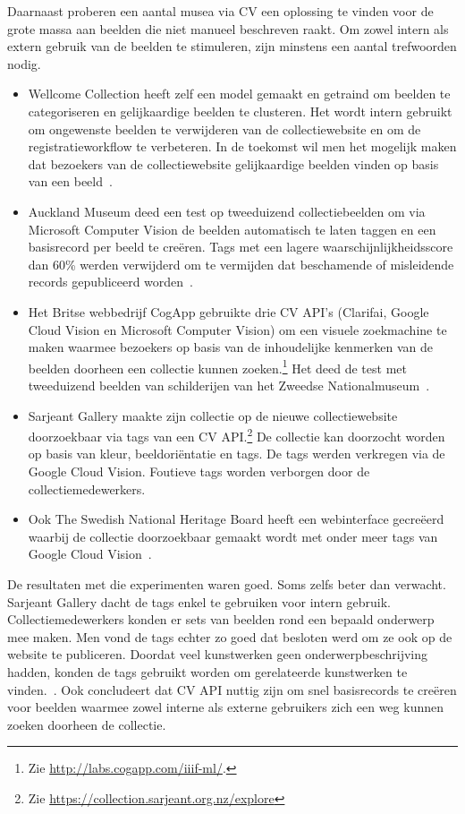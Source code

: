 Daarnaast proberen een aantal musea via CV een oplossing te vinden voor de grote massa aan beelden die niet manueel beschreven raakt. Om zowel intern als extern gebruik van de beelden te stimuleren, zijn minstens een aantal trefwoorden nodig.
\begin{itemize}
	\item Wellcome Collection heeft zelf een model gemaakt en getraind om beelden te categoriseren en gelijkaardige beelden te clusteren. Het wordt intern gebruikt om ongewenste beelden te verwijderen van de collectiewebsite en om de registratieworkflow te verbeteren. In de toekomst wil men het mogelijk maken dat bezoekers van de collectiewebsite gelijkaardige beelden vinden op basis van een beeld~\autocite{Pim2018a}.
	\item Auckland Museum deed een test op tweeduizend collectiebeelden om via Microsoft Computer Vision de beelden automatisch te laten taggen en een basisrecord per beeld te creëren. Tags met een lagere waarschijnlijkheidsscore dan 60\% werden verwijderd om te vermijden dat beschamende of misleidende records gepubliceerd worden~\autocite{Moriarty2018a}.
	\item Het Britse webbedrijf CogApp gebruikte drie CV API’s (Clarifai, Google Cloud Vision en Microsoft Computer Vision) om een visuele zoekmachine te maken waarmee bezoekers op basis van de inhoudelijke kenmerken van de beelden doorheen een collectie kunnen zoeken.\footnote{Zie \url{http://labs.cogapp.com/iiif-ml/}.} Het deed de test met tweeduizend beelden van schilderijen van het Zweedse Nationalmuseum~\autocite{Hindle2017}.
	\item Sarjeant Gallery maakte zijn collectie op de nieuwe collectiewebsite doorzoekbaar via tags van een CV API.\footnote{Zie \url{https://collection.sarjeant.org.nz/explore}} De collectie kan doorzocht worden op basis van kleur, beeldoriëntatie en tags. De tags werden verkregen via de Google Cloud Vision. Foutieve tags worden verborgen door de collectiemedewerkers.~\autocite{Rowe2017} 
	\item Ook The Swedish National Heritage Board heeft een webinterface gecreëerd waarbij de collectie doorzoekbaar gemaakt wordt met onder meer tags van Google Cloud Vision~\autocite{Haskiya2019}.
\end{itemize} 

De resultaten met die experimenten waren goed. Soms zelfs beter dan verwacht. Sarjeant Gallery dacht de tags enkel te gebruiken voor intern gebruik. Collectiemedewerkers konden er sets van beelden rond een bepaald onderwerp mee maken. Men vond de tags echter zo goed dat besloten werd om ze ook op de website te publiceren. Doordat veel kunstwerken geen onderwerpbeschrijving hadden, konden de tags gebruikt worden om gerelateerde kunstwerken te vinden.~\autocite{Rowe2017}. Ook \textcite{Moriarty2018a} concludeert dat CV API nuttig zijn om snel basisrecords te creëren voor beelden waarmee zowel interne als externe gebruikers zich een weg kunnen zoeken doorheen de collectie. 

